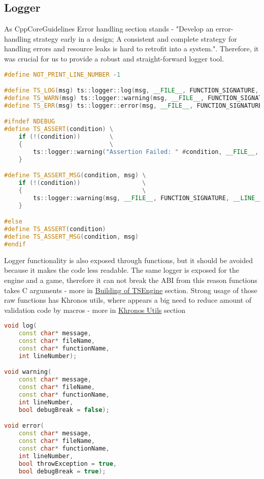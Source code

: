\newpage

\subsection{Logger}
\label{sec:logger}

\hspace{\parindent} As CppCoreGuidelines \cite{CppCoreGuidelines} Error handling section stands - "Develop an error-handling strategy early in a design; A consistent and complete strategy for handling errors and resource leaks is hard to retrofit into a system.". Therefore, it was crucial for us to provide a robust and straight-forward logger tool.
\begin{lstlisting}[language=c++, caption=Logger macros (./engine/include/tsengine/logger.h)]
#define NOT_PRINT_LINE_NUMBER -1

#define TS_LOG(msg) ts::logger::log(msg, __FILE__, FUNCTION_SIGNATURE, __LINE__)
#define TS_WARN(msg) ts::logger::warning(msg, __FILE__, FUNCTION_SIGNATURE, __LINE__)
#define TS_ERR(msg) ts::logger::error(msg, __FILE__, FUNCTION_SIGNATURE, __LINE__)

#ifndef NDEBUG
#define TS_ASSERT(condition) \
    if (!(condition))        \
    {                        \
        ts::logger::warning("Assertion Failed: " #condition, __FILE__, FUNCTION_SIGNATURE, __LINE__, true); \
    }

#define TS_ASSERT_MSG(condition, msg) \
    if (!(condition))                 \
    {                                 \
        ts::logger::warning(msg, __FILE__, FUNCTION_SIGNATURE, __LINE__, true); \
    }

#else
#define TS_ASSERT(condition)
#define TS_ASSERT_MSG(condition, msg)
#endif
\end{lstlisting}

\newpage

Logger functionality is also exposed through functions, but it should be avoided because it makes the code less readable. The same logger is exposed for the engine and a game, therefore it can not break the ABI from this reason functions takes C arguments - more in \hyperref[sec:build]{Building of TSEngine} section.
Strong usage of those raw functions has Khronos utils, where appears a big need to reduce amount of validation code by macros - more in \hyperref[sec:khronos_utils]{Khronos Utils} section
\begin{lstlisting}[language=c++, caption=Logger's functions (./engine/include/tsengine/logger.h)]
void log(
    const char* message,
    const char* fileName,
    const char* functionName,
    int lineNumber);

void warning(
    const char* message,
    const char* fileName,
    const char* functionName,
    int lineNumber,
    bool debugBreak = false);

void error(
    const char* message,
    const char* fileName,
    const char* functionName,
    int lineNumber,
    bool throwException = true,
    bool debugBreak = true);
\end{lstlisting}

